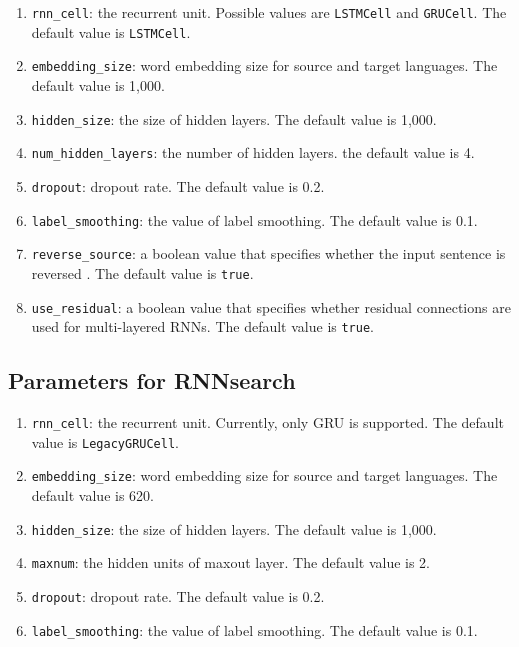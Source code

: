 \documentclass{article}
\begin{document}
\begin{enumerate}
\item \verb|rnn_cell|: the recurrent unit. Possible values are \verb|LSTMCell| and \verb|GRUCell|. The default value is \verb|LSTMCell|.
\item \verb|embedding_size|: word embedding size for source and target languages. The default value is 1,000.
\item \verb|hidden_size|: the size of hidden layers. The default value is 1,000.
\item \verb|num_hidden_layers|: the number of hidden layers. the default value is 4.
\item \verb|dropout|: dropout rate. The default value is 0.2.
\item \verb|label_smoothing|: the value of label smoothing. The default value is 0.1.
\item \verb|reverse_source|: a boolean value that specifies whether the input sentence is reversed \citep{Sutskever:14}. The default value is \verb|true|.
\item \verb|use_residual|: a boolean value that specifies whether residual connections are used for multi-layered RNNs. The default value is \verb|true|.
\end{enumerate}

\subsection{Parameters for RNNsearch}

\begin{enumerate}
\item \verb|rnn_cell|: the recurrent unit. Currently, only GRU is supported. The default value is \verb|LegacyGRUCell|.
\item \verb|embedding_size|: word embedding size for source and target languages. The default value is 620.
\item \verb|hidden_size|: the size of hidden layers. The default value is 1,000.
\item \verb|maxnum|: the hidden units of maxout layer. The default value is 2.
\item \verb|dropout|: dropout rate. The default value is 0.2.
\item \verb|label_smoothing|: the value of label smoothing. The default value is 0.1.
\end{enumerate}
\end{document}
